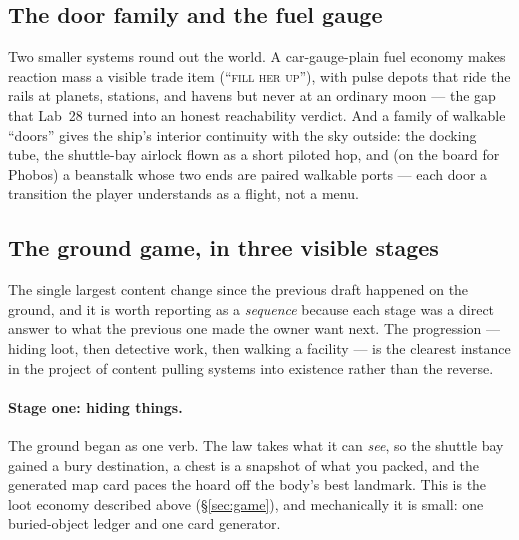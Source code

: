 \documentclass[10pt,twocolumn]{article}
\begin{document}
\subsection{The door family and the fuel gauge}

Two smaller systems round out the world. A car-gauge-plain fuel economy makes reaction mass
a visible trade item (``\textsc{fill her up}''), with pulse depots that ride the rails at
planets, stations, and havens but never at an ordinary moon --- the gap that Lab~28 turned
into an honest reachability verdict. And a family of walkable ``doors'' gives the ship's
interior continuity with the sky outside: the docking tube, the shuttle-bay airlock flown as
a short piloted hop, and (on the board for Phobos) a beanstalk whose two ends are paired
walkable ports --- each door a transition the player understands as a flight, not a menu.

\subsection{The ground game, in three visible stages}
\label{sec:ground}

The single largest content change since the previous draft happened on the ground, and it
is worth reporting as a \emph{sequence} because each stage was a direct answer to what the
previous one made the owner want next. The progression --- hiding loot, then detective work,
then walking a facility --- is the clearest instance in the project of content pulling
systems into existence rather than the reverse.

\paragraph{Stage one: hiding things.} The ground began as one verb. The law takes what it
can \emph{see}, so the shuttle bay gained a bury destination, a chest is a snapshot of what
you packed, and the generated map card paces the hoard off the body's best landmark. This is
the loot economy described above (\S\ref{sec:game}), and mechanically it is small: one
buried-object ledger and one card generator.
\end{document}
